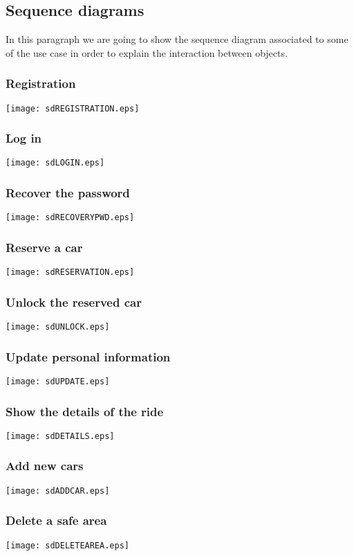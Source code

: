 \pagebreak
\subsection{Sequence diagrams}
In this paragraph we are going to show the sequence diagram associated to some of the use case in order to explain the interaction between objects.

\subsubsection{Registration}
	\centerline{
		\texttt{[image: sdREGISTRATION.eps]}}
	\pagebreak

\subsubsection{Log in}
	\centerline{
		\texttt{[image: sdLOGIN.eps]}}
	\pagebreak

\subsubsection{Recover the password}
	\centerline{
		\texttt{[image: sdRECOVERYPWD.eps]}}
	\pagebreak
	
\subsubsection{Reserve a car}
	\centerline{
		\texttt{[image: sdRESERVATION.eps]}}
	\pagebreak
	
\subsubsection{Unlock the reserved car}
	\centerline{
		\texttt{[image: sdUNLOCK.eps]}}
		\pagebreak

\subsubsection{Update personal information}
	\centerline{
		\texttt{[image: sdUPDATE.eps]}}
	\pagebreak
	
\subsubsection{Show the details of the ride}
	\centerline{
		\texttt{[image: sdDETAILS.eps]}}
	
\subsubsection{Add new cars}
	\centerline{
		\texttt{[image: sdADDCAR.eps]}}

\subsubsection{Delete a safe area}
	\centerline{
		\texttt{[image: sdDELETEAREA.eps]}}
